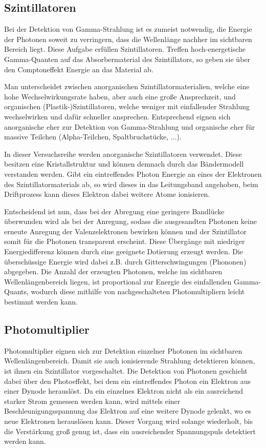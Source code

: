 \subsection{Szintillatoren}

Bei der Detektion von Gamma-Strahlung ist es zumeist notwendig, die Energie der Photonen soweit zu verringern, dass die Wellenlänge nachher im sichtbaren Bereich liegt. Diese Aufgabe erfüllen Szintillatoren. Treffen hoch-energetische Gamma-Quanten auf das Absorbermaterial des Szintillators, so geben sie über den Comptoneffekt Energie an das Material ab. 

Man unterscheidet zwischen anorganischen Szintillatormaterialien, welche eine hohe Wechselwirkungsrate haben, aber auch eine große Ansprechzeit, und organischen (Plastik-)Szintillatoren, welche weniger mit einfallender Strahlung wechselwirken und dafür schneller ansprechen. Entsprechend eignen sich anorganische eher zur Detektion von Gamma-Strahlung und organische eher für massive Teilchen (Alpha-Teilchen, Spaltbruchstücke, ...). 

In dieser Versuchsreihe werden anorganische Szintillatoren verwendet. Diese besitzen eine Kristallstruktur und können demnach durch das Bändermodell verstanden werden. Gibt ein eintreffendes Photon Energie an eines der Elektronen des Szintillatormaterials ab, so wird dieses in das Leitungsband angehoben, beim Driftprozess kann dieses Elektron dabei weitere Atome ionisieren. 

Entscheidend ist nun, dass bei der Abregung eine geringere Bandlücke überwunden wird als bei der Anregung, sodass die ausgesandten Photonen keine erneute Anregung der Valenzelektronen bewirken können und der Szintillator somit für die Photonen transparent erscheint. Diese Übergänge mit niedriger Energiedifferenz können durch eine geeignete Dotierung erzeugt werden. Die überschüssige Energie wird dabei z.B. durch Gitterschwingungen (Phononen) abgegeben. Die Anzahl der erzeugten Photonen, welche im sichtbaren Wellenlängenbereich liegen, ist proportional zur Energie des einfallenden Gamma-Quants, wodurch diese mithilfe von nachgeschalteten Photomultipliern leicht bestimmt werden kann.


\subsection{Photomultiplier}

Photomultiplier eignen sich zur Detektion einzelner Photonen im sichtbaren Wellenlängenbereich. Damit sie auch ionisierende Strahlung detektieren können, ist ihnen ein Szintillator vorgeschaltet. Die Detektion von Photonen geschieht dabei über den Photoeffekt, bei dem ein eintreffendes Photon ein Elektron aus einer Dynode herauslöst. Da ein einzelnes Elektron nicht als ein ausreichend starker Strom gemessen werden kann, wird mittels einer Beschleunigungsspannung das Elektron auf eine weitere Dynode gelenkt, wo es neue Elektronen herauslösen kann. Dieser Vorgang wird solange wiederholt, bis die Verstärkung groß genug ist, dass ein ausreichender Spannungspuls detektiert werden kann.